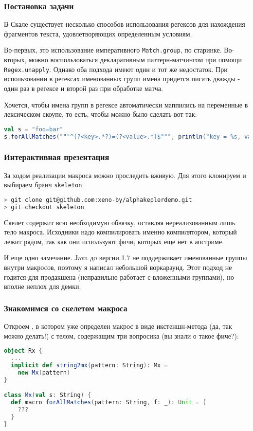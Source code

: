 \documentclass[hyperref={bookmarks=false}]{beamer}
\begin{document}
\begin{frame}[t,fragile]
\frametitle{Постановка задачи}

В Скале существует несколько способов использования регексов для нахождения фрагментов текста, удовлетворяющих определенным условиям.

Во-первых, это использование императивного \texttt{Match.group}, по старинке. Во-вторых, можно воспользоваться декларативным паттерн-матчингом при помощи \texttt{Regex.unapply}. Однако оба подхода имеют один и тот же недостаток. При использовании в регексах именованных групп имена придется писать дважды - один раз в регексе и второй раз при обработке матча.

Хочется, чтобы имена групп в регексе автоматически маппились на переменные в лексическом скоупе, то есть, чтобы можно было сделать вот так:

\begin{lstlisting}[language=scala]
val s = "foo=bar"
s.forAllMatches("""^(?<key>.*?)=(?<value>.*)$""", println("key = %s, value = %s".format(key, value)))
\end{lstlisting}%
\end{frame}

\begin{frame}[t,fragile]
\frametitle{Интерактивная презентация}

За ходом реализации макроса можно проследить вживую. Для этого клонируем  и выбираем бранч \texttt{skeleton}.

\begin{lstlisting}[language=bash]
> git clone git@github.com:xeno-by/alphakeplerdemo.git
> git checkout skeleton
\end{lstlisting}

Скелет содержит всю необходимую обвязку, оставляя нереализованным лишь тело макроса. Исходники надо компилировать именно компилятором, который лежит рядом, так как они используют фичи, которых еще нет в апстриме.

И еще одно замечание. Java до версии 1.7 не поддерживает именованные группы внутри макросов, поэтому я написал небольшой воркараунд. Этот подход не годится для продакшена (неправильно работает с вложенными группами), но вполне неплох для демки.
\end{frame}

\begin{frame}[t,fragile]
\frametitle{Знакомимся со скелетом макроса}

Откроем , в котором уже определен макрос в виде икстеншн-метода (да, так можно делать!) с телом, содержащим три вопросика (вы знали о такое фиче?):

\begin{lstlisting}[language=scala]
object Rx {
  ...
  implicit def string2mx(pattern: String): Mx =
    new Mx(pattern)
}

class Mx(val s: String) {
  def macro forAllMatches(pattern: String, f: _): Unit = {
    ???
  }
}
\end{lstlisting}
\end{frame}
\end{document}
